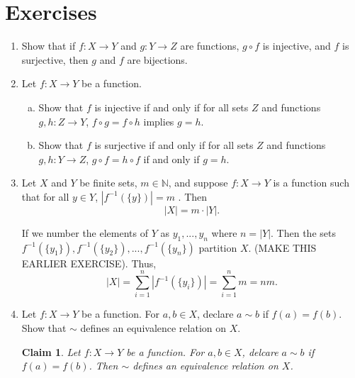 \documentclass[a4paper,12pt,dvipsnames]{book}
\newtheorem{claim}[theorem]{Claim}
\numberwithin{theorem}{chapter}
\theoremstyle{remark}
\begin{document}
\section{Exercises}


\begin{enumerate}
\item Show that if $f:X\rightarrow Y$ and $g:Y\rightarrow Z$ are  functions, $g\circ f$ is injective, and $f$ is surjective, then $g$ and $f$ are bijections. 

\item Let $f:X\rightarrow Y$ be a function. 

\begin{enumerate}[(a)]
\item Show that $f$ is injective if and only if for all sets $Z$ and functions $g,h:Z\rightarrow Y$, $f\circ g=f\circ h$ implies $g=h$. 
\item Show that $f$ is surjective if and only if for all sets $Z$ and functions $g,h:Y\rightarrow Z$, $g\circ f = h\circ f$ if and only if $g=h$. 
\end{enumerate}


\item Let $X$ and $Y$ be finite sets, $m\in \mathbb{N}$, and suppose $f:X\rightarrow Y$ is a function such that for all $y\in Y$, $|f^{-1}(\{y\})|=m$ . Then
\[
|X|=m\cdot |Y|.\]


\begin{solution}


If we number the elements of $Y$ as $y_{1},...,y_{n}$ where $n=|Y|$. Then the sets $f^{-1}(\{y_{1}\}),f^{-1}(\{y_{2}\}),...,f^{-1}(\{y_{n}\})$ partition $X$. (MAKE THIS EARLIER EXERCISE). Thus,
\[
|X|=\sum_{i=1}^{n}| f^{-1}(\{y_{i}\})| = \sum_{i=1}^{n}m=nm.
\]
\end{solution}






\item Let $f:X\rightarrow Y$ be a function. For $a,b\in X$, declare $a\sim b$ if $f(a)=f(b)$. 
Show that $\sim$ defines an equivalence relation on $X$. 


\begin{solution}
\begin{claim}
Let $f:X\rightarrow Y$ be a function. For $a,b\in X$, delcare $a\sim b$ if $f(a)=f(b)$. Then $\sim$ defines an equivalence relation on $X$. 
\end{claim}


\end{solution}
\end{enumerate}
\end{document}
